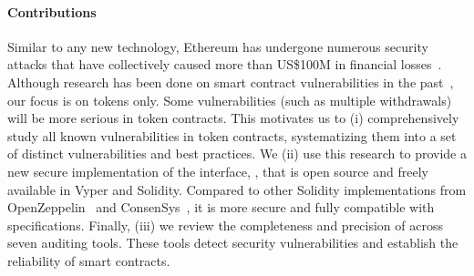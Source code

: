 \paragraph{\textbf{Contributions}} Similar to any new technology, Ethereum has undergone numerous security attacks that have collectively caused more than US\$100M in financial losses~\cite{DAO1,PeckShield,PartiyMultiSig,MyEthWallet,ParityFirstHack,ParitySecondHack}. Although research has been done on smart contract vulnerabilities in the past~\cite{EthSecServ}, our focus is on \erc tokens only. Some vulnerabilities (such as multiple withdrawals) will be more serious in token contracts. This motivates us to (i) comprehensively study all known vulnerabilities in \erc token contracts, systematizing them into a set of distinct vulnerabilities and best practices. We (ii) use this research to provide a new secure implementation of the \erc interface, \sys, that is open source and freely available in Vyper and Solidity. Compared to other Solidity implementations from OpenZeppelin~\cite{OpenZepplin} and ConsenSys~\cite{ConsensysToken}, it is more secure and fully compatible with \erc specifications. Finally, (iii) we review the completeness and precision of \sys across seven auditing tools. These tools detect security vulnerabilities and establish the reliability of smart contracts. 




